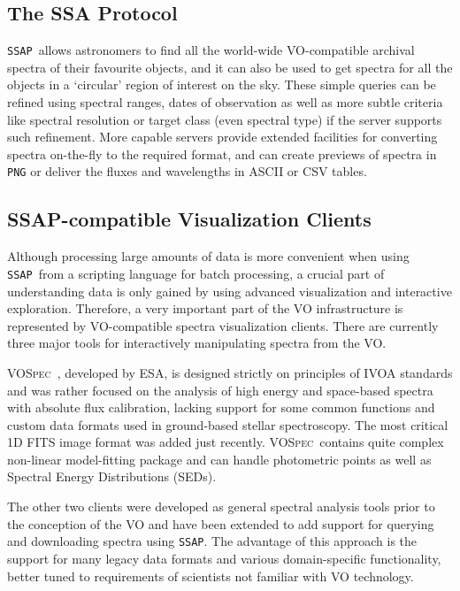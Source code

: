 \documentclass[final,authoryear,5p,times,twocolumn]{elsarticle}
\newcommand{\ssap}{\texttt{SSAP}}
\newcommand{\vospec}{\textsc{VOSpec}}
\newcommand{\ascl}[1]{\href{http://www.ascl.net/#1}{ascl:#1}}
\begin{document}
\subsection{The SSA Protocol}
%
\ssap\ allows astronomers to find all the world-wide VO-compatible archival
spectra of their favourite objects, and it can also be used to get spectra for all
the objects in a `circular' region of interest on the sky. These simple
queries can be refined using spectral ranges, dates of observation as well as
more subtle criteria like spectral resolution or target class (even
spectral type) if the server supports such refinement. More capable servers
provide extended facilities for converting spectra on-the-fly to the required
format, and can create previews of spectra in \texttt{PNG} or deliver
the fluxes and wavelengths in ASCII or CSV tables.

\subsection{SSAP-compatible  Visualization Clients}

Although processing large amounts of data is more convenient when
using \ssap\ from a scripting language for batch processing, a crucial
part of understanding data is only gained by using advanced visualization and interactive
exploration.  Therefore, a very important part of the VO
infrastructure is represented by VO-compatible spectra visualization
clients. There are currently three major tools for interactively manipulating
spectra from the VO.

\vospec\ \citep[][\ascl{1205.011}]{2005ASPC..347..198O}, developed by ESA, is
designed strictly on principles of IVOA standards and was rather focused on
the analysis of high energy and space-based spectra with absolute flux
calibration, lacking support for some common functions and custom data formats
used in ground-based stellar spectroscopy. The most critical 1D FITS image
format was added just recently. \vospec\ contains quite complex non-linear
model-fitting package and can handle photometric points as well as Spectral
Energy Distributions (SEDs).

The other two clients were developed as general spectral analysis
tools prior to the conception of the VO and have been extended to add
support for querying and downloading spectra using \ssap.  The
advantage of this approach is the support for many legacy data formats
and various domain-specific functionality, better tuned to
requirements of scientists not familiar with VO technology.
\end{document}
